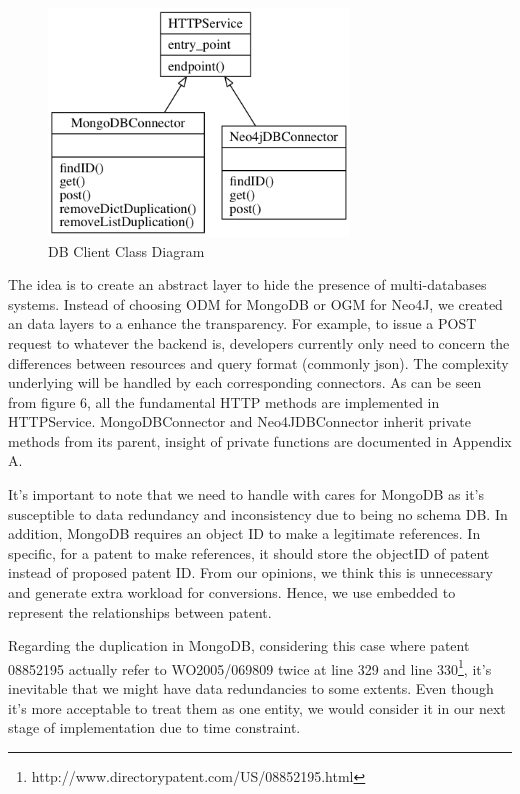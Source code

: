 \documentclass{sig-alternate}
\begin{document}
{\begin{figure}[htb]
\centering
\includegraphics[width=80mm,scale=10]{db_client.png}
\caption{ DB Client Class Diagram}
\end{figure}

The idea is to create an abstract layer to hide the presence of multi-databases systems. Instead of choosing ODM for MongoDB or OGM for Neo4J, we created an data layers to a enhance the transparency. For example, to issue a POST request to whatever the backend is, developers currently only need to concern the differences between resources and query format (commonly json). The complexity underlying will be handled by each corresponding connectors. As can be seen from figure 6, all the fundamental HTTP methods are implemented in HTTPService. MongoDBConnector and Neo4JDBConnector inherit private methods from its parent, insight of private functions are documented in Appendix A. 

It's important to note that we need to handle with cares for MongoDB as it's susceptible to data redundancy and inconsistency due to being no schema DB. In addition, MongoDB requires an object ID to make a legitimate references. In specific, for a patent to make references, it should store the objectID of patent instead of proposed patent ID. From our opinions, we think this is unnecessary and generate extra workload for conversions. Hence, we use embedded to represent the relationships between patent. 

Regarding the duplication in MongoDB, considering this case where patent 08852195 actually refer to WO2005/069809 twice at line 329 and line 330\footnote{http://www.directorypatent.com/US/08852195.html}, it's inevitable that we might have data redundancies to some extents. Even though it's more acceptable to treat them as one entity, we would consider it in our next stage of implementation due to time constraint.

}
\end{document}
